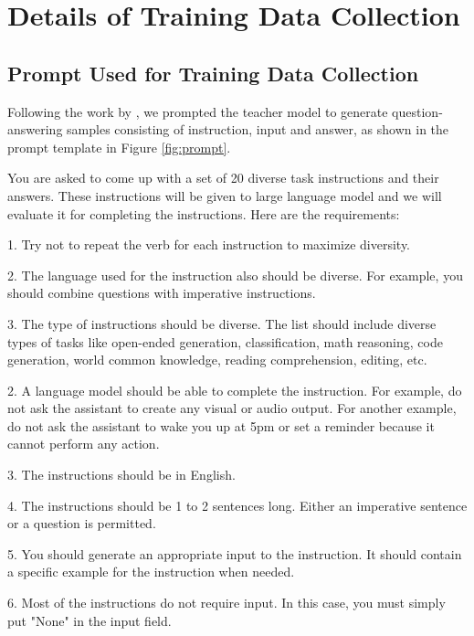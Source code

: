 \section{Details of Training Data Collection}
\label{sec:training-data}
\subsection{Prompt Used for Training Data Collection} 
\label{sec:prompt}
Following the work by \citet{sander2024watermarking}, we prompted the teacher model to generate question-answering samples consisting of instruction, input and answer, as shown in the prompt template in Figure \ref{fig:prompt}.
\begin{figure*}[h!]
\begin{tcolorbox}[colback=gray!10, colframe=black, rounded corners]
You are asked to come up with a set of 20 diverse task instructions and their answers. These instructions will be given to large
language model and we will evaluate it for completing the instructions. Here are the requirements:

\vspace{5pt}

1. Try not to repeat the verb for each instruction to maximize diversity.

2. The language used for the instruction also should be diverse. For example, you should combine questions
with imperative instructions.

3. The type of instructions should be diverse. The list should include diverse types of tasks like open-ended
generation, classification, math reasoning, code generation, world common knowledge, reading comprehension, editing, etc.

2. A language model should be able to complete the instruction. For example, do not ask the assistant to create any visual or audio output. For another example, do not ask the assistant to wake you up at 5pm or set a reminder because it cannot perform any action.

3. The instructions should be in English.

4. The instructions should be 1 to 2 sentences long. Either an imperative sentence or a question is permitted.

5. You should generate an appropriate input to the instruction. It should contain a specific example for the instruction when needed.

6. Most of the instructions do not require input. In this case, you must simply put "None" in the input field.


\end{tcolorbox}
\end{figure*}
